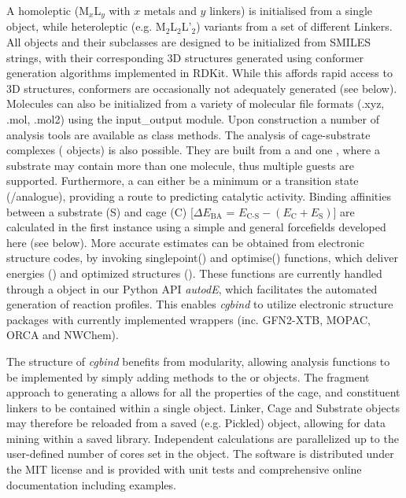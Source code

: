 \documentclass[../../main.tex]{subfiles}
\newcommand{\cgbind}{\emph{cgbind }}
\newcommand{\de}{$\Delta E$}
\begin{document}
A homoleptic  (M$_x$L$_y$ with $x$ metals and $y$ linkers) is initialised from a single  object, while heteroleptic (e.g. M$_2$L$_2$L’$_2$) variants from a set of different Linkers. All  objects and their subclasses are designed to be initialized from SMILES strings,\cite{Weininger1988} with their corresponding 3D structures generated using conformer generation algorithms implemented in RDKit.\cite{Landrum2019, Riniker2015}  While this affords rapid access to 3D structures, conformers are occasionally not adequately generated (see below). Molecules can also be initialized from a variety of molecular file formats (.xyz, .mol, .mol2) using the input\_output module. Upon  construction a number of analysis tools are available as class methods. The analysis of cage-substrate complexes ( objects) is also possible. They are built from a  and one , where a substrate may contain more than one molecule, thus multiple guests are supported. Furthermore, a  can either be a minimum or a transition state (/analogue), providing a route to predicting catalytic activity.
Binding affinities between a substrate (S) and cage (C) [\de$_\text{BA}$ = $E_\text{C-S} - (E_\text{C} + E_\text{S})]$ are calculated in the first instance using a simple and general forcefields developed here (see below). More accurate estimates can be obtained from electronic structure codes, by invoking singlepoint() and optimise() functions, which deliver energies () and optimized structures (). These functions are currently handled through a  object in our Python API \emph{autodE},\cite{autodE} which facilitates the automated generation of reaction profiles. This enables \cgbind to utilize electronic structure packages with currently implemented wrappers (inc. GFN2-XTB,\cite{Bannwarth2019} MOPAC,\cite{Stewart2016} ORCA\cite{Neese2017} and NWChem\cite{Valiev2010}).

The structure of \cgbind benefits from modularity, allowing analysis functions to be implemented by simply adding methods to the  or  objects. The fragment approach to generating a  allows for all the properties of the cage, and constituent linkers to be contained within a single object. Linker, Cage and Substrate objects may therefore be reloaded from a saved (e.g. Pickled)  object, allowing for data mining within a saved library. Independent calculations are parallelized up to the user-defined number of cores set in the  object. The software is distributed under the MIT license and is provided with unit tests and comprehensive online documentation including examples.
\end{document}
